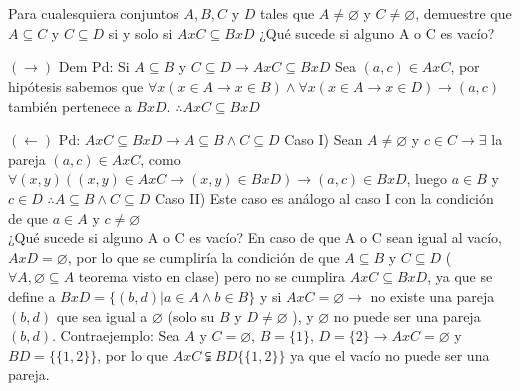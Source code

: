 \section{}
Para cualesquiera conjuntos $A, B, C$ y $D$ tales que $A \neq  \varnothing$ y $C \neq \varnothing$, demuestre que $A \subseteq C$ y $C \subseteq D$ si y solo si $A x C \subseteq B x D$ ¿Qué sucede si alguno A o C es vacío?\newline

$(\rightarrow)$\newline
Dem Pd: Si $A \subseteq B$ y $C \subseteq D \rightarrow AxC \subseteq BxD$\newline
Sea $(a,c) \in AxC$, por hipótesis sabemos que $\forall x (x \in A \rightarrow x \in B) \wedge \forall x (x \in A \rightarrow x \in D) \rightarrow (a,c)$ también pertenece a $BxD$.\newline
$\therefore AxC \subseteq BxD$ \newline

$(\leftarrow)$\newline
Pd: $AxC \subseteq BxD \rightarrow A \subseteq B \wedge C \subseteq D$\newline
Caso I) Sean $A \neq \varnothing$ y $c \in C \rightarrow \exists$ la pareja $(a,c) \in AxC$, \newline
como $\forall (x,y)((x,y) \in AxC \rightarrow (x,y) \in BxD) \rightarrow (a,c) \in BxD$,\newline
luego $a \in B$ y $c \in D$\newline
$\therefore A \subseteq B \wedge C \subseteq D$\newline
Caso II) Este caso es análogo al caso I con la condición de que $a \in A$ y $c \neq \varnothing$\newline\\

¿Qué sucede si alguno A o C es vacío?\newline
En caso de que A o C sean igual al vacío, $AxD = \varnothing$, por lo que se cumpliría la condición de que $A \subseteq B$ y $C \subseteq D$ ($\forall A, \varnothing \subseteq A $ teorema visto en clase) pero no se cumplira $AxC \subseteq BxD$, ya que se define a  $BxD = \{ (b,d) | a \in A \wedge b \in B\}$ y si $AxC = \varnothing \rightarrow$ no existe una pareja $(b,d)$ que sea igual a  $\varnothing$ (solo su $B$ y $D \neq \varnothing$ ), y $\varnothing$ no puede ser una pareja $(b,d)$.\newline
Contraejemplo:\newline
Sea $A$ y $C = \varnothing$, $B = \{ 1\}$, $D = \{2\} \rightarrow AxC = \varnothing$ y $BD = \{\{1,2\} \}$, \newline
por lo que $AxC \subsetneqq BD\{\{1,2\}\} $  ya que el vacío no puede ser una pareja. 